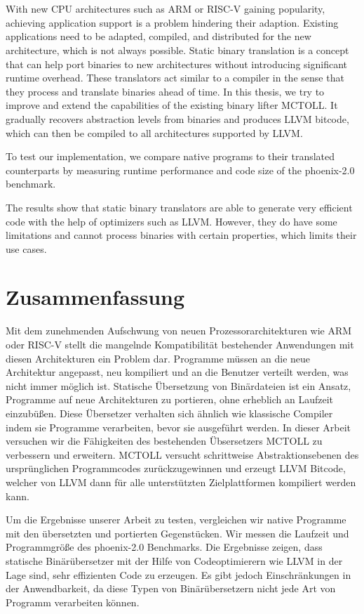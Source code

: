 \chapter{\abstractname}\label{ch:abstract}

With new CPU architectures such as ARM or RISC-V gaining popularity, achieving application support is a problem hindering their adaption.
Existing applications need to be adapted, compiled, and distributed for the new architecture, which is not always possible.
Static binary translation is a concept that can help port binaries to new architectures without introducing significant runtime overhead.
These translators act similar to a compiler in the sense that they process and translate binaries ahead of time.
In this thesis, we try to improve and extend the capabilities of the existing binary lifter MCTOLL\@.
It gradually recovers abstraction levels from binaries and produces LLVM bitcode, which can then be compiled to all architectures supported by LLVM\@.

To test our implementation, we compare native programs to their translated counterparts by measuring runtime performance and code size of the phoenix-2.0 benchmark.

The results show that static binary translators are able to generate very efficient code with the help of optimizers such as LLVM\@.
However, they do have some limitations and cannot process binaries with certain properties, which limits their use cases.

\chapter{Zusammenfassung}\label{ch:zusammenfassung}

Mit dem zunehmenden Aufschwung von neuen Prozessorarchitekturen wie ARM oder RISC-V stellt die mangelnde Kompatibilität bestehender Anwendungen mit diesen Architekturen ein Problem dar.
Programme müssen an die neue Architektur angepasst, neu kompiliert und an die Benutzer verteilt werden, was nicht immer möglich ist.
Statische Übersetzung von Binärdateien ist ein Ansatz, Programme auf neue Architekturen zu portieren, ohne erheblich an Laufzeit einzubüßen.
Diese Übersetzer verhalten sich ähnlich wie klassische Compiler indem sie Programme verarbeiten, bevor sie ausgeführt werden.
In dieser Arbeit versuchen wir die Fähigkeiten des bestehenden Übsersetzers MCTOLL zu verbessern und erweitern.
MCTOLL versucht schrittweise Abstraktionsebenen des ursprünglichen Programmcodes zurückzugewinnen und erzeugt LLVM Bitcode, welcher von LLVM dann für alle unterstützten Zielplattformen kompiliert werden kann.

Um die Ergebnisse unserer Arbeit zu testen, vergleichen wir native Programme mit den übersetzten und portierten Gegenstücken.
Wir messen die Laufzeit und Programmgröße des phoenix-2.0 Benchmarks.
Die Ergebnisse zeigen, dass statische Binärübersetzer mit der Hilfe von Codeoptimierern wie LLVM in der Lage sind, sehr effizienten Code zu erzeugen.
Es gibt jedoch Einschränkungen in der Anwendbarkeit, da diese Typen von Binärübersetzern nicht jede Art von Programm verarbeiten können.
